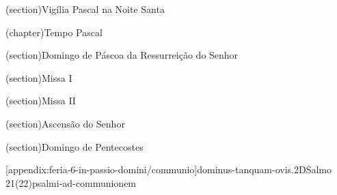 \uchapter(section){Vigília Pascal na Noite Santa}\label{section:hebdomada-sancta/ad-vigiliam-paschalem-in-nocte-sancta}


\upart(chapter){Tempo Pascal}\label{chapter:tempus-paschale}

\uchapter*(section){Domingo de Páscoa da Ressurreição do Senhor}\label{section:tempus-paschale/dominica-resurrectionis}


\AllowPageBreak

\uchapter(section){Missa I}\label{section:tempus-paschale/missa-1}


\AllowPageFlush

\uchapter(section){Missa II}\label{section:tempus-paschale/missa-2}


\AllowPageFlush

\Solemnitas(section){Ascensão do Senhor}{}\label{section:tempus-paschale/in-ascencione-domini}


\AllowPageFlush

\Solemnitas(section){Domingo de Pentecostes}{}\label{section:tempus-paschale/dominica-pentecostes}


\appendix

\label{appendix}

[appendix:feria-6-in-passio-domini/communio]{dominus-tanquam-ovis.2D}{Salmo 21(22)}{psalmi-ad-communionem}